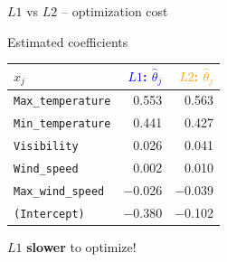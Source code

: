 \documentclass[11pt,compress,t,notes=noshow, xcolor=table]{beamer}
\begin{document}
\begin{vbframe}{$L1$ vs $L2$ -- optimization cost}
\begin{minipage}[c]{0.45\textwidth}
    \vspace{0.5cm}
    
    Estimated coefficients \\
    
    \begin{tabular}{l|r|r}
        $x_j$ & \textcolor{blue}{$L1$: $\hat \theta_j$}  &
        \textcolor{orange}{$L2$: $\hat \theta_j$} \\ \hline
        \texttt{Max\_temperature} & 0.553 & 0.563 \\
        \texttt{Min\_temperature} & 0.441 & 0.427 \\
        \texttt{Visibility} & 0.026 & 0.041 \\
        \texttt{Wind\_speed} & 0.002 & 0.010 \\
        \texttt{Max\_wind\_speed} & $-$0.026 & $-$0.039 \\
        \texttt{(Intercept)} & $-$0.380 & $-$0.102 \\
    \end{tabular}
    
    \vspace{0.5cm}
    \normalsize
    $L1$ \textbf{slower} to optimize!
\end{minipage}

\end{vbframe}

\endlecture
\end{document}
